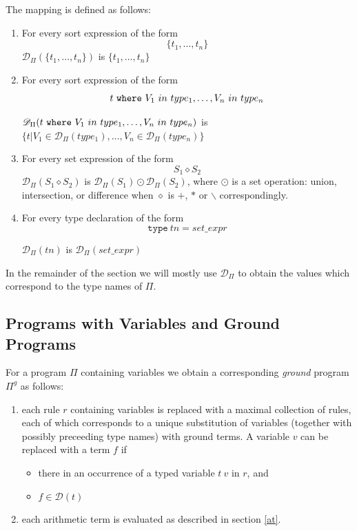 \documentclass[a4paper,10pt]{article}
\begin{document}
\medskip\noindent 
The mapping is defined as follows:

\begin{enumerate}
\item For every sort expression of the form $$\{t_1,\ldots,t_n\}$$   $\mathcal{D}_\Pi(\{t_1,\ldots,t_n\})$ is $ \{t_1,\ldots,t_n\}$
\item For every sort expression of the form   $$t~\mbox{\texttt{where}} ~V_1~in~type_1,\ldots, V_n~in~type_n$$
 
\noindent
$\mathcal{D}_\Pi(t~\mbox{\texttt{where}} ~V_1~in~type_1,\ldots, V_n~in~type_n)$ is $\{t| V_1 \in \mathcal{D}_\Pi(type_1),\ldots, V_n \in \mathcal{D}_\Pi(type_n)\}$ 
\item For every set expression of the form $$S_1 \diamond S_2$$ 
$\mathcal{D}_\Pi(S_1 \diamond S_2)$ is $ \mathcal{D}_\Pi(S_1) \odot  \mathcal{D}_\Pi(S_2)$, where $\odot$ is a set operation: union, intersection, or difference when $\diamond$ is $+$, $*$ or $\backslash$ correspondingly.

\item For every type declaration of the form $$\texttt{type}~tn = set\_expr$$

$\mathcal{D}_\Pi(tn)$ is $\mathcal{D}_\Pi(set\_expr)$  


\end{enumerate}

\medskip\noindent
In the remainder of the section  we will mostly  use   $\mathcal{D}_\Pi$ to obtain the values  which correspond to the type names of $\Pi$.


\subsection{Programs with Variables and Ground Programs}\label{grp}

For a program $\Pi$ containing variables we obtain a corresponding \textit{ground} program $\Pi^g$ as follows:
\begin{enumerate}
\item each rule $r$ containing variables is replaced with a maximal collection of rules, each of which corresponds to a unique substitution 
of  variables (together with possibly preceeding type names)  with ground terms. A variable $v$ can be replaced with a term $f$ if
\begin{itemize}
\item there in an occurrence of a typed variable $t~v$ in $r$, and
\item  $f\in \mathcal{D}(t)$
\end{itemize}  
\item each arithmetic term is evaluated as described in section  \ref{at}.
\end{enumerate}
\end{document}

